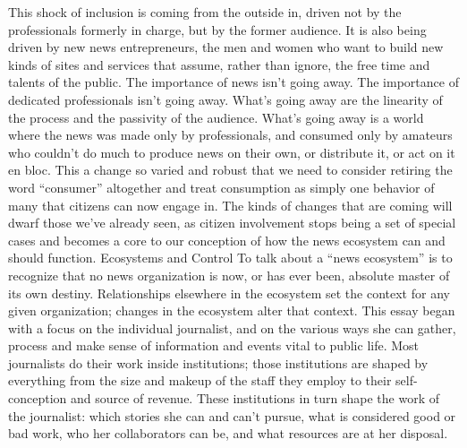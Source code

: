 This shock of inclusion is coming from the outside in, driven not by the professionals
formerly in charge, but by the former audience. It is also being driven
by new news entrepreneurs, the men and women who want to build new kinds
of sites and services that assume, rather than ignore, the free time and talents of
the public.
The importance of news isn’t going away. The importance of dedicated professionals
isn’t going away. What’s going away are the linearity of the process and the
passivity of the audience. What’s going away is a world where the news was made
only by professionals, and consumed only by amateurs who couldn’t do much to
produce news on their own, or distribute it, or act on it en bloc.
This a change so varied and robust that we need to consider retiring the word
``consumer'' altogether and treat consumption as simply one behavior of many
that citizens can now engage in. The kinds of changes that are coming will dwarf
those we’ve already seen, as citizen involvement stops being a set of special cases
and becomes a core to our conception of how the news ecosystem can and
should function.
Ecosystems and Control
To talk about a ``news ecosystem'' is to recognize that no news organization is
now, or has ever been, absolute master of its own destiny. Relationships elsewhere
in the ecosystem set the context for any given organization; changes in the ecosystem
alter that context.
This essay began with a focus on the individual journalist, and on the various
ways she can gather, process and make sense of information and events vital to
public life. Most journalists do their work inside institutions; those institutions are
shaped by everything from the size and makeup of the staff they employ to their
self-conception and source of revenue. These institutions in turn shape the work
of the journalist: which stories she can and can’t pursue, what is considered good
or bad work, who her collaborators can be, and what resources are at her disposal.

